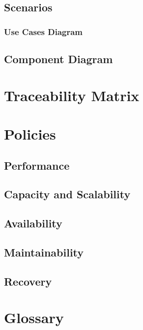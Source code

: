 \documentclass[12pt]{article}
\begin{document}
	\subsection{Scenarios}
	
	

	\subsubsection{Use Cases Diagram}
	


	\subsection {Component Diagram}
	


	\section{Traceability Matrix}



\lstset{language=Java}

\section{Policies}


	\subsection{Performance}


	
	\subsection{Capacity and Scalability}



	
	\subsection{Availability}


	
	\subsection{Maintainability}



	\subsection{Recovery}



\section{Glossary}
\end{document}
